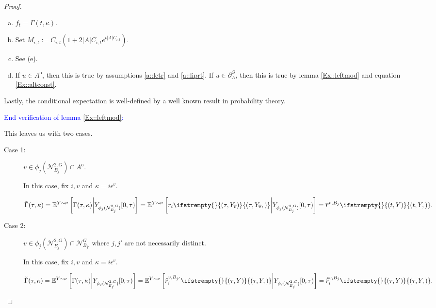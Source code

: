 \documentclass[12pt]{article}
\newcommand{\skipLine}{\vspace{12pt}}
\newcommand{\mb}{\mathbb}
\newcommand{\mc}{\mathcal}
\newcommand{\ov}{\overline}
\newcommand{\ep}{\epsilon}
\newcommand{\tb}{\textcolor{blue}}
\newcommand{\exmu}[2]{\mb{E}^{#1}\left[#2\right]}	%
\newcommand{\defeq}{:=}								%
\newcommand{\gneigh}[2]{\mc{N}^{#1}_{#2}}			%
\newcommand{\dgneigh}[2]{\mc{N}^{2,#1}_{#2}}		%
\newcommand{\cl}[1]{\ov{#1}}						%
\newcommand{\gbdry}[2]{\partial^{#1}_{#2}}			%
\newcommand{\rate}{r}								%
\newcommand{\vind}[1]{_{#1}}						%
\newcommand{\tmi}[1]{#1}							%
\newcommand{\stpara}[1]{_{#1}}						%
\newcommand{\jumpibd}[2]{C_{#1,#2}}					%
\newcommand{\tmepro}[3]{
\ifstrempty{#3}{
	\left(#1,#2\right)}{
	\left(#1,#2,#3\right)}}							%
\newcommand{\Xg}{Y}									%
\newcommand{\brate}{\alt{\rate}}					%
\newcommand{\inte}[1]{{#1}^\mathrm{o}}				%
\newcommand{\alt}[1]{\tilde{#1}}					%
\newcommand{\rt}{\tau}								%
\renewcommand{\mark}{\kappa}						%
\newcommand{\ratee}{\Gamma}							%
\newcommand{\cratee}{\alt{\ratee}}					%
\newcommand{\mm}{\nu}								%
\newcommand{\ev}[1]{\ep^{#1}}						%
\newcommand{\const}{M}								%
\newcommand{\sttpara}[2]{_{#1,#2}}					%
\newcommand{\bgrate}{\ov{\rate}}					%
\newcommand{\bcrate}{\hat{\brate}}					%
\newcommand{\vjpara}[2]{^{#1,#2}}					%
\begin{document}
\begin{proof}
\begin{enumerate}[(a)]
\item \(f_t = \ratee(t,\mark)\).

\item Set \(\const\sttpara{i}{t} \defeq \jumpibd{i}{t}(1 + 2|A|\jumpibd{i}{t}e^{t|A|\jumpibd{i}{t}})\).

\item See (e).

\item If \(u \in \inte{A}\), then this is true by assumptions \ref{a::lctr} and \ref{a::liprt}. If \(u \in \gbdry{G}{A}\), then this is true by lemma \ref{Ex::leftmod} and equation \eqref{Ex::altconst}.
\end{enumerate}

Lastly, the conditional expectation is well-defined by a well known result in probability theory.

\skipLine

\tb{End verification of lemma \ref{Ex::leftmod}:}

\skipLine

This leaves us with two cases.

\begin{description}
\item[Case 1: ] \(v \in \phi_j(\dgneigh{G}{B_j})\cap\inte{A}\).

In this case, fix \(i,v\) and \(\mark = i\ev{v}\).

\begin{align*}
\cratee(\rt,\mark) &= \exmu{\Xg\sim\mm}{\ratee(\rt,\mark)\middle|\Xg\vind{\phi_j(\dgneigh{G}{B_j})}\tmi{[0,\rt)}} = \exmu{\Xg\sim\mm}{\rate\stpara{i}\tmepro{\rt}{\Xg\vind{\cl{v}}}{}\middle|\Xg\vind{\phi_j(\dgneigh{G}{B_j})}\tmi{[0,\rt)}} = \bgrate\vjpara{v}{B_j}\tmepro{t}{\Xg}{}.
\end{align*}

\skipLine

\item[Case 2: ] \(v \in \phi_j(\dgneigh{G}{B_j})\cap\gneigh{G}{B_{j'}}\) where \(j,j'\) are not necessarily distinct.

In this case, fix \(i,v\) and \(\mark = i\ev{v}\).

\begin{align*}
\cratee(\rt,\mark) &= \exmu{\Xg\sim\mm}{\ratee(\rt,\mark)\middle|\Xg\vind{\phi_j(\dgneigh{G}{B_j})}\tmi{[0,\rt)}} = \exmu{\Xg\sim\mm}{\brate\vjpara{v}{B_{j'}}\stpara{i}\tmepro{\rt}{\Xg}{}\middle|\Xg\vind{\phi_j(\dgneigh{G}{B_j})}\tmi{[0,\rt)}} = \bcrate\vjpara{v}{B_j}\stpara{i}\tmepro{\rt}{\Xg}{}.
\end{align*}


\end{description}
\end{proof}
\end{document}
